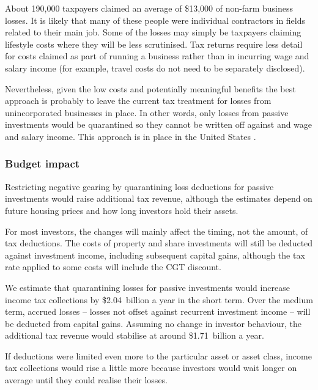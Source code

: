 \documentclass{grattan}\usepackage[]{graphicx}\usepackage[]{color}
\begin{document}
About 190,000 taxpayers claimed an average of \$13,000 of non-farm business losses. It is likely that many of these people were individual contractors in fields related to their main job. Some of the losses may simply be taxpayers claiming lifestyle costs where they will be less scrutinised. Tax returns require less detail for costs claimed as part of running a business rather than in incurring wage and salary income (for example, travel costs do not need to be separately disclosed). 



Nevertheless, given the low costs and potentially meaningful benefits the best approach is probably to leave the current tax treatment for losses from unincorporated businesses in place. In other words, only losses from passive investments would be quarantined so they cannot be written off against and wage and salary income. This approach is in place in the United States . 

\subsubsection{Budget impact}
Restricting negative gearing by quarantining loss deductions for passive investments would raise additional tax revenue, although the estimates depend on future housing prices and how long investors hold their assets. 

For most investors, the changes will mainly affect the timing, not the amount, of tax deductions. The costs of property and share investments will still be deducted against investment income, including subsequent capital gains, although the tax rate applied to some costs will include the CGT discount. 



We estimate that quarantining losses for passive investments would increase income tax collections by \$2.04~billion a year in the short term. Over the medium term, accrued losses -- losses not offset against recurrent investment income -- will be deducted from capital gains. Assuming no change in investor behaviour, the additional tax revenue would stabilise at around \$1.71~billion a year.

If deductions were limited even more to the particular asset or asset class, income tax collections would rise a little more because investors would wait longer on average until they could realise their losses. 
\end{document}
